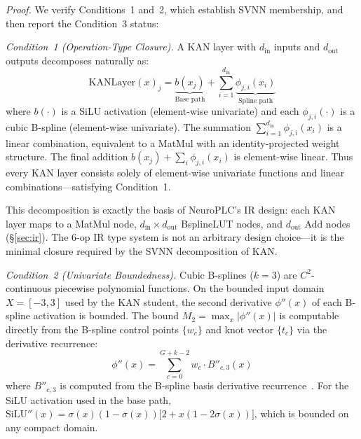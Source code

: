 \vspace{4pt}
\noindent\textit{Proof.} We verify Conditions~1 and~2, which establish SVNN
membership, and then report the Condition~3 status:

\vspace{2pt}
\noindent\textit{Condition~1 (Operation-Type Closure).}
A KAN layer with $d_{\text{in}}$ inputs and $d_{\text{out}}$ outputs
decomposes naturally as:
\begin{equation}
\text{KANLayer}(x)_j = \underbrace{b(x_j)}_{\text{Base path}}
+ \sum_{i=1}^{d_{\text{in}}}
\underbrace{\phi_{j,i}(x_i)}_{\text{Spline path}}
\label{eq:kan_decomposition}
\end{equation}
where $b(\cdot)$ is a SiLU activation (element-wise univariate) and each
$\phi_{j,i}(\cdot)$ is a cubic B-spline (element-wise univariate).
The summation $\sum_{i=1}^{d_{\text{in}}} \phi_{j,i}(x_i)$ is a linear
combination, equivalent to a MatMul with an identity-projected weight
structure. The final addition $b(x_j) + \sum_i \phi_{j,i}(x_i)$ is
element-wise linear. Thus every KAN layer consists solely of
element-wise univariate functions and linear combinations---satisfying
Condition~1.

This decomposition is exactly the basis of NeuroPLC's IR design: each
KAN layer maps to a MatMul node, $d_{\text{in}} \times d_{\text{out}}$
BsplineLUT nodes, and $d_{\text{out}}$ Add nodes ({\S}\ref{sec:ir}).
The 6-op IR type system is not an arbitrary design choice---it is the
minimal closure required by the SVNN decomposition of KAN.

\vspace{2pt}
\noindent\textit{Condition~2 (Univariate Boundedness).}
Cubic B-splines ($k=3$) are $C^2$-continuous piecewise polynomial
functions. On the bounded input domain $X = [-3, 3]$ used by the KAN
student, the second derivative $\phi''(x)$ of each B-spline activation
is bounded. The bound $M_2 = \max_x |\phi''(x)|$ is computable directly
from the B-spline control points $\{w_c\}$ and knot vector $\{t_c\}$
via the derivative recurrence:
\begin{equation}
\phi''(x) = \sum_{c=0}^{G+k-2} w_c \cdot B''_{c,3}(x)
\label{eq:bspline_second_deriv}
\end{equation}
where $B''_{c,3}$ is computed from the B-spline basis derivative
recurrence~\cite{deBoor1978}. For the SiLU activation used in the base
path, $\text{SiLU}''(x) = \sigma(x)(1-\sigma(x))\bigl[2 + x(1-2\sigma(x))\bigr]$,
which is bounded on any compact domain.

